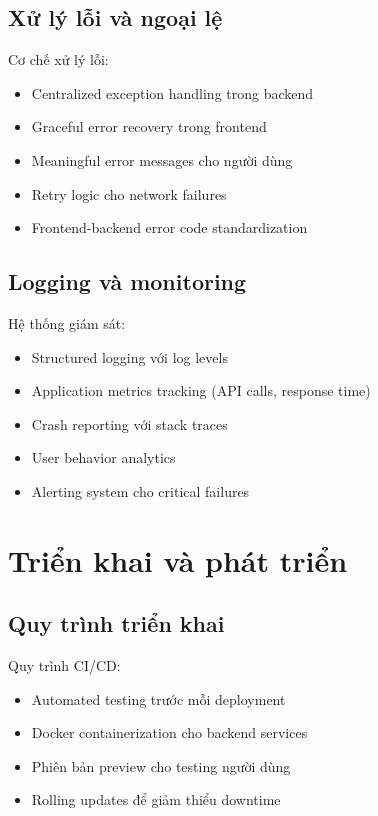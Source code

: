 \subsection{Xử lý lỗi và ngoại lệ}
Cơ chế xử lý lỗi:

\begin{itemize}[leftmargin=1cm]
    \item Centralized exception handling trong backend
    \item Graceful error recovery trong frontend
    \item Meaningful error messages cho người dùng
    \item Retry logic cho network failures
    \item Frontend-backend error code standardization
\end{itemize}

\subsection{Logging và monitoring}
Hệ thống giám sát:

\begin{itemize}[leftmargin=1cm]
    \item Structured logging với log levels
    \item Application metrics tracking (API calls, response time)
    \item Crash reporting với stack traces
    \item User behavior analytics
    \item Alerting system cho critical failures
\end{itemize}

\section{Triển khai và phát triển}

\subsection{Quy trình triển khai}
Quy trình CI/CD:

\begin{itemize}[leftmargin=1cm]
    \item Automated testing trước mỗi deployment
    \item Docker containerization cho backend services
    \item Phiên bản preview cho testing người dùng
    \item Rolling updates để giảm thiểu downtime
\end{itemize}


